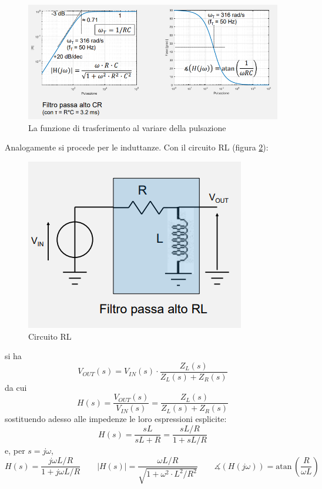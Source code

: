 \documentclass{article}
\begin{document}
\begin{figure}[h]
  \centering
  \includegraphics[scale=0.7]{IM_circuito_CR_passivo_grafici}
  \caption{La funzione di trasferimento al variare della pulsazione}
  \label{Schema_circuito_CR_passivo_grafici}
\end{figure}

Analogamente si procede per le induttanze. Con il circuito RL (figura \ref{Schema_circuito_RL_passivo}):

\begin{figure}[h]
  \centering
  \includegraphics[scale=0.7]{IM_circuito_RL_passivo}
  \caption{Circuito RL}
  \label{Schema_circuito_RL_passivo}
\end{figure}

si ha
\[V_{OUT}(s) = V_{IN}(s) \cdot \frac{Z_L(s)}{Z_L(s) + Z_R(s)}\]
da cui 
\[H(s) = \frac{V_{OUT} (s)}{V_{IN} (s)} = \frac{Z_L(s)}{Z_L(s) + Z_R(s)}\]
sostituendo adesso alle impedenze le loro espressioni esplicite:
\[H(s) = \frac{sL}{sL + R} = \frac{sL/R}{1 + sL/R}\]
e, per $s = j\omega$, 
\[H(s) = \frac{j \omega L/R}{1 + j \omega L/R} \quad \quad |H(s)| = \frac{\omega L/R}{\sqrt{1 + \omega ^2 \cdot L^2 / R^2}} \quad \quad \measuredangle (H(j \omega)) = \textrm{atan}\, \left(\frac{R}{\omega L} \right)\]
\end{document}
